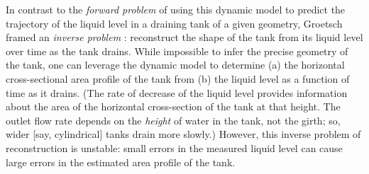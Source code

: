 \documentclass[a4paper,fleqn]{cas-dc}
\begin{document}
In contrast to the \emph{forward problem} of using this dynamic model to predict the trajectory of the liquid level in a draining tank of a given geometry, Groetsch \cite{groetsch1993inverse_tl,groetsch1999inverse} framed an \emph{inverse problem} \cite{groetsch1993inverse,neto2012introduction,tarantola2005inverse}: reconstruct the shape of the tank from its liquid level over time as the tank drains. 
While impossible to infer the precise geometry of the tank, one can leverage the dynamic model to determine
(a) the horizontal cross-sectional area profile of the tank from (b) the liquid level as a function of time as it drains. (The rate of decrease of the liquid level provides information about the area of the horizontal cross-section of the tank at that height. The outlet flow rate depends on the \emph{height} of water in the tank, not the girth; so, wider [say, cylindrical] tanks drain more slowly.)
However, this inverse problem of reconstruction is unstable: small errors in the measured liquid level can cause large errors in the estimated area profile of the tank. \cite{groetsch1993inverse_tl}
\end{document}
